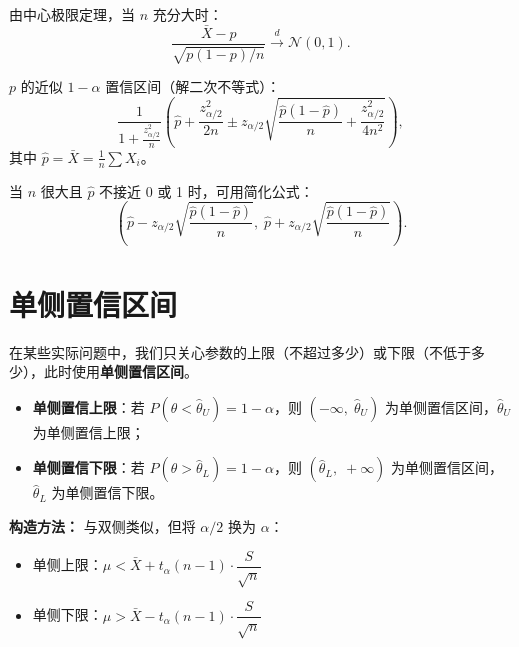 由中心极限定理，当 $n$ 充分大时：
\begin{equation}
    \frac{\bar{X} - p}{\sqrt{p(1-p)/n}} \xrightarrow{d} \mathcal{N}(0,1).
\end{equation}

$p$ 的近似 $1-\alpha$ 置信区间（解二次不等式）：
\begin{equation}
    \boxed{\frac{1}{1 + \frac{z_{\alpha/2}^2}{n}}
           \left(\hat{p} + \frac{z_{\alpha/2}^2}{2n}
           \pm z_{\alpha/2} \sqrt{\frac{\hat{p}(1-\hat{p})}{n} + \frac{z_{\alpha/2}^2}{4n^2}}\right)},
\end{equation}
其中 $\hat{p} = \bar{X} = \frac{1}{n}\sum X_i$。

当 $n$ 很大且 $\hat{p}$ 不接近 0 或 1 时，可用简化公式：
\begin{equation}
    \boxed{\left(\hat{p} - z_{\alpha/2} \sqrt{\frac{\hat{p}(1-\hat{p})}{n}},\;
                 \hat{p} + z_{\alpha/2} \sqrt{\frac{\hat{p}(1-\hat{p})}{n}}\right)}.
\end{equation}

\section{单侧置信区间}

在某些实际问题中，我们只关心参数的上限（不超过多少）或下限（不低于多少），此时使用\textbf{单侧置信区间}。

\begin{definition}[单侧置信区间]
\begin{itemize}
    \item \textbf{单侧置信上限}：若 $P(\theta < \hat{\theta}_U) = 1 - \alpha$，则 $(-\infty,\; \hat{\theta}_U)$ 为单侧置信区间，$\hat{\theta}_U$ 为单侧置信上限；
    \item \textbf{单侧置信下限}：若 $P(\theta > \hat{\theta}_L) = 1 - \alpha$，则 $(\hat{\theta}_L,\; +\infty)$ 为单侧置信区间，$\hat{\theta}_L$ 为单侧置信下限。
\end{itemize}
\end{definition}

\textbf{构造方法：} 与双侧类似，但将 $\alpha/2$ 换为 $\alpha$：

\begin{example}
\begin{itemize}
    \item 单侧上限：$\mu < \bar{X} + t_{\alpha}(n-1) \cdot \dfrac{S}{\sqrt{n}}$
    \item 单侧下限：$\mu > \bar{X} - t_{\alpha}(n-1) \cdot \dfrac{S}{\sqrt{n}}$
\end{itemize}
\end{example}

